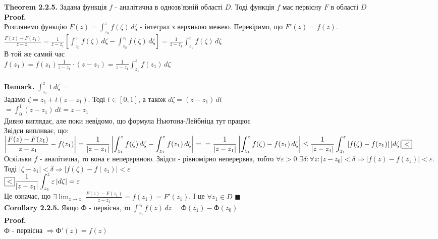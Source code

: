\documentclass[a4paper, 14pt]{extarticle}
\def\hugespace{\vspace{5mm} \\}
\begin{document}
	\textbf{Theorem 2.2.5.} Задана функція $f$ - аналітична в однозв'язній області $D$. Тоді функція $f$ має первісну $F$ в області $D$\\
	\textbf{Proof.}\\
	Розглянемо функцію $F(z)=\displaystyle \int_{z_0}^z f(\zeta)\,d\zeta$ - інтеграл з верхньою межею. Перевіримо, що $F'(z)=f(z)$.\\
	$\displaystyle \frac{F(z)-F(z_1)}{z-z_1} = \frac{1}{z-z_1} \left[ \int_{z_0}^z f(\zeta)\,d\zeta - \int_{z_0}^{z_1} f(\zeta)\,d\zeta \right] = \frac{1}{z-z_1} \int_{z_1}^z f(\zeta)\,d\zeta$\\
	В той же самий час\\
	$\displaystyle f(z_1)=f(z_1)\frac{1}{z-z_1}\cdot(z-z_1)=\frac{1}{z-z_1} \int_{z_1}^z f(z_1)\,d\zeta$\\
	\hugespace
	\textbf{Remark.} $\displaystyle\int _{z_1}^z 1\,d\zeta \boxed{=}$\\
	Задамо $\zeta = z_1+t(z-z_1)$. Тоді $t \in [0,1]$, а також $d\zeta = (z-z_1)\,dt$\\
	$\boxed{=} \displaystyle\int _0^1 (z-z_1)\,dt = z-z_1$\\
	Дивно виглядає, але поки невідомо, що формула Ньютона-Лейбніца тут працює
	\hugespace
	Звідси випливає, що:\\
	$\displaystyle \left\lvert \frac{F(z)-F(z_1)}{z-z_1} - f(z_1) \right\rvert = \frac{1}{|z-z_1|} \left\lvert \int_{z_1}^z f(\zeta)\,d\zeta - \int_{z_1}^z f(z_1)\,d\zeta \right\rvert =\\= \frac{1}{|z-z_1|} \left\lvert \int_{z_1}^z f(\zeta)-f(z_1)\,d\zeta \right\rvert \leq \frac{1}{|z-z_1|} \int_{z_1}^z |f(\zeta)-f(z_1)|\,|d\zeta|\fbox{<}$\\
	Оскільки $f$ - аналітична, то вона є неперервною. Звідси - рівномірно неперервна, тобто $\forall \varepsilon>0$ $\exists \delta: \forall z: |z-z_0|<\delta \Rightarrow |f(z)-f(z_1)|<\varepsilon$. Тоді $|\zeta - z_1|<\delta \Rightarrow |f(\zeta)-f(z_1)|<\varepsilon$\\
	$\displaystyle \fbox{<} \frac{1}{|z-z_1|} \int_{z_1}^z \varepsilon \,|d\zeta| = \varepsilon$\\
	Це означає, що $\displaystyle \exists \lim_{z\to z_1} \frac{F(z)-F(z_1)}{z-z_1}=f(z_1)=F'(z_1)$. І це $\forall z_1 \in D$ $\blacksquare$
	\hugespace
	\textbf{Corollary 2.2.5.} Якщо $\textrm{Ф}$ - первісна, то $\displaystyle \int_{z_0}^{z_1} f(z)\,dz = \textrm{Ф}(z_1)-\textrm{Ф}(z_0)$\\
	\textbf{Proof.}\\
	$\textrm{Ф}$ - первісна $\Rightarrow \textrm{Ф}'(z)=f(z)$\\
\end{document}
